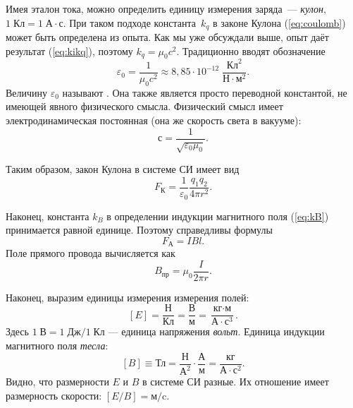 Имея эталон тока, можно определить единицу измерения заряда~--- \emph{кулон},
$1\;\text{Кл}=1\;\text{А}\cdot\text{с}$. При таком подходе константа~$k_{q}$ в законе Кулона (\ref{eq:coulomb}) может быть определена
из опыта. Как мы уже обсуждали выше, опыт даёт результат (\ref{eq:kikq}),
поэтому $k_{q}=\mu_{0}c^{2}$. Традиционно вводят обозначение
\begin{equation}
\varepsilon_{0}=\frac{1}{\mu_{0}c^{2}}\approx8{,}85\cdot10^{-12}\;\frac{\text{Кл}^{2}}{\text{Н}\cdot\text{м}^{2}}.
\end{equation}
Величину $\varepsilon_{0}$ называют .
Она также является просто переводной константой, не имеющей
явного физического смысла. Физический смысл имеет электродинамическая
постоянная (она же скорость
света в вакууме):
\[
с = \frac{1}{\sqrt{\varepsilon_{0}\mu_{0}}}.
\]


Таким образом, закон Кулона в системе СИ имеет вид
\begin{equation}
F_{\text{К}}=\frac{1}{\varepsilon_{0}}\frac{q_{1}q_{2}}{4\pi r^{2}}.
\end{equation}

Наконец, константа $k_{B}$ в определении индукции магнитного поля
(\ref{eq:kB}) принимается равной единице. Поэтому справедливы формулы
\begin{equation}
F_{\text{А}}=IBl.
\end{equation}
Поле прямого провода вычисляется как
\[
B_{\text{пр}}=\mu_{0}\dfrac{I}{2\pi r}.
\]

Наконец, выразим единицы измерения измерения полей:
\[
\left[E\right]=\frac{\text{Н}}{\text{Кл}}=\frac{\text{В}}{\text{м}}=\frac{\text{кг}\cdot\text{м}}{\text{А}\cdot\text{с}^{3}}.
\]
Здесь $1\;\text{В}=1\;\text{Дж}/1\;\text{Кл}$ --- единица напряжения
\emph{вольт}. Единица индукции магнитного поля \emph{тесла}:
\[
\left[B\right]\equiv\text{Тл}=\frac{\text{Н}}{\text{А}^{2}}\cdot\frac{\text{А}}{\text{м}}=\frac{\text{кг}}{\text{А}\cdot\text{с}^{2}}.
\]
Видно, что размерности $E$ и $B$ в системе СИ разные. Их отношение имеет размерность
скорости: $\left[E/B\right]=\text{м/c}$.

